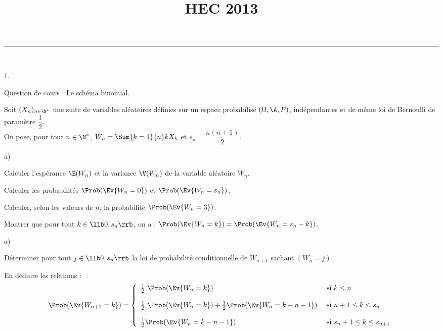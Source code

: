 \documentclass[11pt]{article}%
\title{\bf \vspace{-1.6cm} HEC 2013} %
\author{} %
\date{} %
\begin{document}
\maketitle %
\vspace{-1.2cm}\hrule %
\thispagestyle{fancy}

\vspace*{.2cm}



\begin{exerciceAP}~
  \begin{noliste}{1.}
    \setlength{\itemsep}{2mm}
  \item Question de cours : Le schéma binomial.
  \item Soit $(X_n)_{ n \in \N^* }$ une suite de variables aléatoires
    définies sur un espace probabilisé $(\Omega , \A , P )$,
    indépendantes et de même loi de Bernoulli de paramètre
    $\dfrac{1}{2}$.\\
    On pose, pour tout $n \in \N^*$, $W_n = \Sum{k=1}{n} k X_k$ et
    $s_n = \dfrac{n(n+1)}{2}$.
    \begin{noliste}{a)}
      \setlength{\itemsep}{2mm}
    \item Calculer l'espérance $\E(W_n)$ et la variance $\V(W_n)$ de
      la variable aléatoire $W_n$.
    \item Calculer les probabilités $\Prob(\Ev{W_n = 0})$ et
      $\Prob(\Ev{W_n = s_n})$.
    \item Calculer, selon les valeurs de $n$, la probabilité
      $\Prob(\Ev{W_n = 3})$.
    \end{noliste}

  \item Montrer que pour tout $k \in \llb 0, s_n \rrb$, on a :
    $\Prob(\Ev{W_n = k}) = \Prob(\Ev{W_n = s_n - k})$.

  \item 
    \begin{noliste}{a)}
      \setlength{\itemsep}{2mm}
    \item Déterminer pour tout $j \in \llb 0, s_n \rrb$ la loi de
      probabilité conditionnelle de $W_{n+1}$ sachant $(W_n = j)$.
    \item En déduire les relations :
      \[
      \Prob(\Ev{W_{n+1} = k}) = \left\{
        \begin{array}{ll} 
          \frac{ 1 }{ 2 } \ \Prob(\Ev{W_n = k}) & \text{ si } k \leq n \\ 
          \\ 
          \frac{ 1 }{ 2 } \ \Prob(\Ev{W_n = k}) + \frac{1}{2}
          \Prob(\Ev{W_n = k-n-1}) & \text{ si } n+1 \leq k \leq s_n \\ 
          \\
          \frac{1}{2} \Prob(\Ev{W_n = k-n-1}) & \text{ si } s_n + 1 \leq
          k \leq s_{n+1} 
        \end{array} 
      \right.
      \]
    \end{noliste}
  \end{noliste}
\end{exerciceAP}
\end{document}
